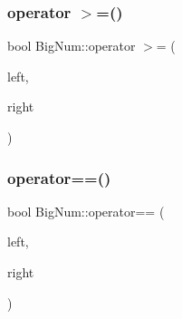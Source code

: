 \mbox{\label{namespace_big_num_a21b831b8aa13287c1465e13437f92b8d}} 
\subsubsection{\texorpdfstring{operator $>$=()}{operator >=()}}
{\footnotesize\ttfamily bool Big\+Num\+::operator $>$= (\begin{DoxyParamCaption}\item[{const \mbox{\hyperlink{class_big_num_1_1_big_numbers}{Big\+Numbers}} \&}]{left,  }\item[{const \mbox{\hyperlink{class_big_num_1_1_big_numbers}{Big\+Numbers}} \&}]{right }\end{DoxyParamCaption})}

\mbox{\label{namespace_big_num_ac79a01b5674ec11020f9f848a1e9c343}} 
\subsubsection{\texorpdfstring{operator==()}{operator==()}}
{\footnotesize\ttfamily bool Big\+Num\+::operator== (\begin{DoxyParamCaption}\item[{const \mbox{\hyperlink{class_big_num_1_1_big_numbers}{Big\+Numbers}} \&}]{left,  }\item[{const \mbox{\hyperlink{class_big_num_1_1_big_numbers}{Big\+Numbers}} \&}]{right }\end{DoxyParamCaption})}

